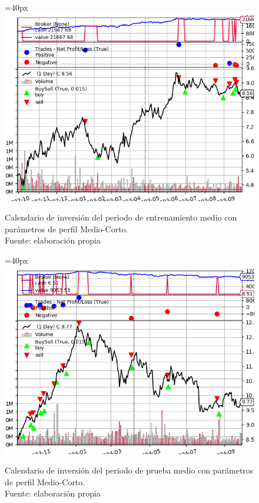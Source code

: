      	\begin{figure}[H]
     		\centering\leftskip=40px
     		\includegraphics[scale=0.66]{imagenes/M_Large-Medium_train.png}
     		\caption[Calendario de inversi\'on del periodo de entrenamiento largo.]{Calendario de inversi\'on del periodo de entrenamiento medio con par\'ametros de perfil Medio-Corto.\\ Fuente: elaboraci\'on propia}
     		\label{fig:medium_period_mtrain}
     	\end{figure}
     	
     	\begin{figure}[H]
     		\centering\leftskip=40px
     		\includegraphics[scale=0.66]{imagenes/M_Large-Medium_test.png}
     		\caption[Calendario de inversi\'on del periodo de prueba medio]{Calendario de inversi\'on del periodo de prueba medio con par\'ametros de perfil Medio-Corto.\\ Fuente: elaboraci\'on propia}
     		\label{fig:medium_period_mtest}
     	\end{figure} 

